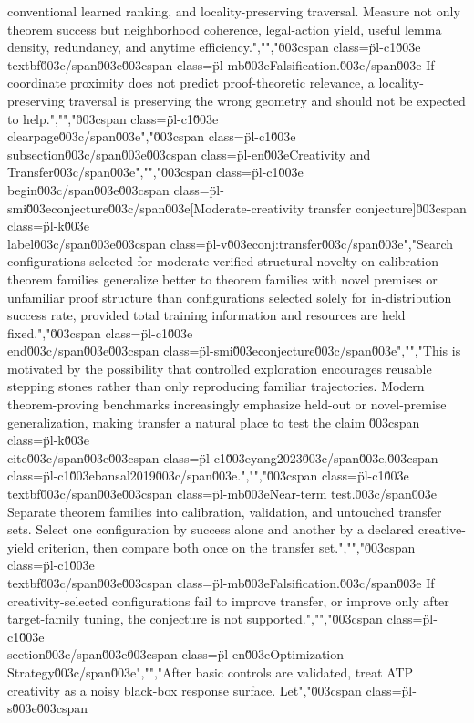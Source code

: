 {{{conventional learned ranking, and locality-preserving traversal. Measure not only theorem success but neighborhood coherence, legal-action yield, useful lemma density, redundancy, and anytime efficiency.","","\u003cspan class=\"pl-c1\"\u003e\\textbf\u003c/span\u003e{\u003cspan class=\"pl-mb\"\u003eFalsification.\u003c/span\u003e} If coordinate proximity does not predict proof-theoretic relevance, a locality-preserving traversal is preserving the wrong geometry and should not be expected to help.","","\u003cspan class=\"pl-c1\"\u003e\\clearpage\u003c/span\u003e","\u003cspan class=\"pl-c1\"\u003e\\subsection\u003c/span\u003e{\u003cspan class=\"pl-en\"\u003eCreativity and Transfer\u003c/span\u003e}","","\u003cspan class=\"pl-c1\"\u003e\\begin\u003c/span\u003e{\u003cspan class=\"pl-smi\"\u003econjecture\u003c/span\u003e}[Moderate-creativity transfer conjecture]\u003cspan class=\"pl-k\"\u003e\\label\u003c/span\u003e{\u003cspan class=\"pl-v\"\u003econj:transfer\u003c/span\u003e}","Search configurations selected for moderate verified structural novelty on calibration theorem families generalize better to theorem families with novel premises or unfamiliar proof structure than configurations selected solely for in-distribution success rate, provided total training information and resources are held fixed.","\u003cspan class=\"pl-c1\"\u003e\\end\u003c/span\u003e{\u003cspan class=\"pl-smi\"\u003econjecture\u003c/span\u003e}","","This is motivated by the possibility that controlled exploration encourages reusable stepping stones rather than only reproducing familiar trajectories. Modern theorem-proving benchmarks increasingly emphasize held-out or novel-premise generalization, making transfer a natural place to test the claim \u003cspan class=\"pl-k\"\u003e\\cite\u003c/span\u003e{\u003cspan class=\"pl-c1\"\u003eyang2023\u003c/span\u003e,\u003cspan class=\"pl-c1\"\u003ebansal2019\u003c/span\u003e}.","","\u003cspan class=\"pl-c1\"\u003e\\textbf\u003c/span\u003e{\u003cspan class=\"pl-mb\"\u003eNear-term test.\u003c/span\u003e} Separate theorem families into calibration, validation, and untouched transfer sets. Select one configuration by success alone and another by a declared creative-yield criterion, then compare both once on the transfer set.","","\u003cspan class=\"pl-c1\"\u003e\\textbf\u003c/span\u003e{\u003cspan class=\"pl-mb\"\u003eFalsification.\u003c/span\u003e} If creativity-selected configurations fail to improve transfer, or improve only after target-family tuning, the conjecture is not supported.","","\u003cspan class=\"pl-c1\"\u003e\\section\u003c/span\u003e{\u003cspan class=\"pl-en\"\u003eOptimization Strategy\u003c/span\u003e}","","After basic controls are validated, treat ATP creativity as a noisy black-box response surface. Let","\u003cspan class=\"pl-s\"\u003e\u003cspan }}}
